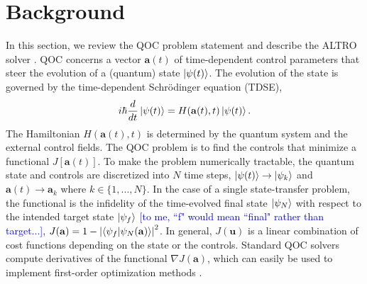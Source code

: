 \section{Background \label{sec:background}}
In this section, we
review the QOC problem statement
and describe the ALTRO solver \cite{howell2019altro}.
QOC concerns a vector $\mathbf{a}(t)$ of time-dependent control parameters 
that steer the evolution of a (quantum) state $\ket{\psi(t)}$.
The evolution of the state is governed by the time-dependent
Schr{\"o}dinger equation (TDSE),
\begin{equation}
  i \hbar \frac{d}{dt} \ket{\psi(t)} = H(\mathbf{a}(t), t) \ket{\psi(t)}.
  \label{eq:tdse}
\end{equation}
The Hamiltonian $H(\mathbf{a}(t), t)$ is determined by the quantum system and the external control fields.
The QOC problem is to find the
controls that minimize a functional $J[\mathbf{a}(t)]$.
To make the problem numerically tractable,
the quantum state and controls are discretized into $N$ time steps, $\ket{\psi(t)}\to\ket{\psi_k}$ and $\mathbf{a}(t)\to \mathbf{a}_k$ where $k \in \{1, ..., N\}$.
In the case of a single state-transfer problem, the functional is
the infidelity of the time-evolved final state $\ket{\psi_N}$ with respect to the intended target state $\ket{\psi_f}$ \textcolor{blue}{[to me, ``f" would mean ``final" rather than target...]},
$J(\mathbf{a}) = 1 - {\lvert \braket{\psi_{f}}{\psi_{N}(\mathbf{a})} \rvert}^{2}$.
In general, $J(\mathbf{u})$ is a linear combination of cost functions depending on the state
 or the controls.
Standard QOC solvers compute derivatives of the functional $\nabla J(\mathbf{a})$,
which can easily be used to implement first-order optimization methods
\cite{machnes2015tunable, khaneja2005optimal, leung2017speedup, goerz2019krotov}.


